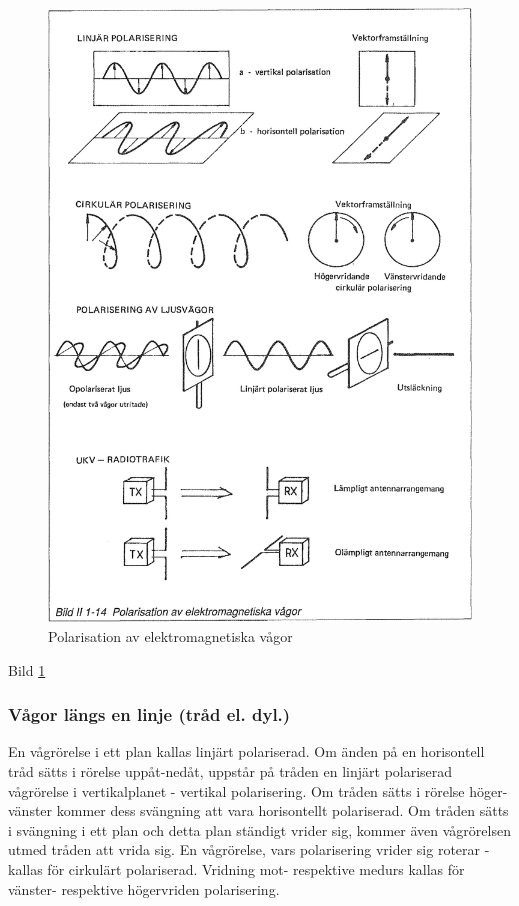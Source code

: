\begin{figure}
\begin{center}
\includegraphics[width=14cm]{images/bild_2_1-14}
\caption{Polarisation av elektromagnetiska vågor}
\label{fig:BildII1-14}
\end{center}
\end{figure}

Bild \ref{fig:BildII1-14}

\subsubsection{Vågor längs en linje (tråd el. dyl.)}
En vågrörelse i ett plan kallas linjärt polariserad. Om änden på en horisontell
tråd sätts i rörelse uppåt-nedåt, uppstår på tråden en linjärt polariserad
vågrörelse i vertikalplanet - vertikal polarisering.
Om tråden sätts i rörelse höger-vänster kommer dess svängning att vara
horisontellt polariserad.
Om tråden sätts i svängning i ett plan och detta plan ständigt vrider sig,
kommer även vågrörelsen utmed tråden att vrida sig. En vågrörelse, vars
polarisering vrider sig roterar - kallas för cirkulärt polariserad. Vridning
mot- respektive medurs kallas för vänster- respektive högervriden polarisering.


